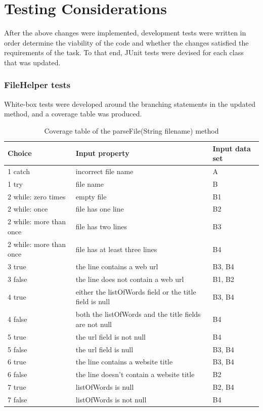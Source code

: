 \section{Testing Considerations}
After the above changes were implemented, development tests were written in order determine the viability of the code and whether the changes satisfied the requirements of the task. To that end, JUnit tests were devised for each class that was updated.

\subsubsection{FileHelper tests}

White-box tests were developed around the branching statements in the updated method, and a coverage table was produced.

\begin{table}[!h]
    \caption{Coverage table of the parseFile(String filename) method}
    \begin{tabular}{|l|p{100pt}|l|}
        \hline
        \textbf{Choice} & \textbf{Input property} & \textbf{Input data set} \\ \hline
        1 catch & incorrect file name & A \\ \hline
        1 try & file name & B \\ \hline
        2 while: zero times & empty file & B1 \\ \hline
        2 while: once & file has one line & B2 \\ \hline
        2 while: more than once & file has two lines & B3 \\ \hline
        2 while: more than once & file has at least three lines & B4 \\ \hline
        3 true & the line contains a web url & B3, B4 \\ \hline
        3 false & the line does not contain a web url & B1, B2 \\ \hline
        4 true & either the listOfWords field or the title field is null & B3, B4 \\ \hline
        4 false & both the listOfWords and the title fields are not null & B4 \\ \hline
        5 true & the url field is not null & B4 \\ \hline
        5 false & the url field is null & B3, B4 \\ \hline
        6 true & the line contains a website title & B3, B4 \\ \hline
        6 false & the line doesn't contain a website title & B2 \\ \hline
        7 true & listOfWords is null & B2, B4 \\ \hline
        7 false & listOfWords is not null & B4 \\ \hline
    \end{tabular}
\end{table}

